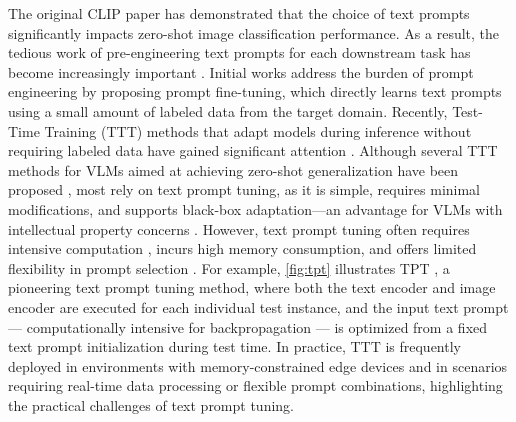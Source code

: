 The original CLIP paper \citep{radford2021learning} has demonstrated that the choice of text prompts significantly impacts zero-shot image classification performance.
As a result, the tedious work of pre-engineering text prompts for each downstream task has become increasingly important \citep{gu2023systematic,zhu2023prompt,bulat2023lasp}.
Initial works \citep{zhou2022learning,zhou2022conditional} address the burden of prompt engineering by proposing prompt fine-tuning, which directly learns text prompts using a small amount of labeled data from the target domain.
Recently, Test-Time Training (TTT) methods that adapt models during inference without requiring labeled data have gained significant attention \citep{boudiaf2022parameter,chen2022contrastive,wang2020tent}.
Although several TTT methods for VLMs aimed at achieving zero-shot generalization have been proposed \citep{shu2022test,sui2024just,yoon2024c,metzen2023autoclip}, most rely on text prompt tuning, as it is simple, requires minimal modifications, and supports black-box adaptation—an advantage for VLMs with intellectual property concerns \citep{zhang2024vision}.
However, text prompt tuning often requires intensive computation \citep{karmanov2024efficient, zanella2024test}, incurs high memory consumption, and offers limited flexibility in prompt selection \citep{zanella2024test}.
For example, \cref{fig:tpt} illustrates TPT \citep{shu2022test}, a pioneering text prompt tuning method, where both the text encoder and image encoder are executed for each individual test instance, and the input text prompt — computationally intensive for backpropagation — is optimized from a fixed text prompt initialization during test time.
In practice, TTT is frequently deployed in environments with memory-constrained edge devices \citep{cai2020tinytl,song2023ecotta} and in scenarios requiring real-time data processing \citep{wang2023test,azimi2022self} or flexible prompt combinations, highlighting the practical challenges of text prompt tuning.

